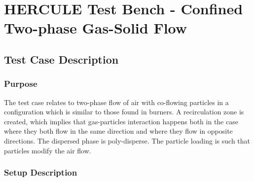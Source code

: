 
\newlength{\largfigpp}
\setlength{\largfigpp}{4.5cm}
\newlength{\largfigk}
\setlength{\largfigk}{6.5cm}
\newlength{\largfigp}
\setlength{\largfigp}{8cm}
\newlength{\largfign}
\setlength{\largfign}{10cm}
\newlength{\largfigm}
\setlength{\largfigm}{12cm}
\newlength{\largfigt}
\setlength{\largfigt}{13cm}
\newlength{\largfigi}
\setlength{\largfigi}{14cm}
\newlength{\largfigg}
\setlength{\largfigg}{16cm}
\newlength{\largleg}
\setlength{\largleg}{12cm}

\renewcommand{\IMAGES}{./IMAGES}

\chapter{HERCULE Test Bench - Confined Two-phase Gas-Solid Flow}


\section{Test Case Description}

\subsection{Purpose}

The test case relates to two-phase flow of air with co-flowing particles in a configuration which is similar to those found in burners. A recirculation zone is created, which implies that gas-particles interaction happens both in the case where they both flow in the same direction and where they flow in opposite directions. The dispersed phase is poly-disperse. The particle loading is such that particles modify the air flow.

\subsection{Setup Description}


